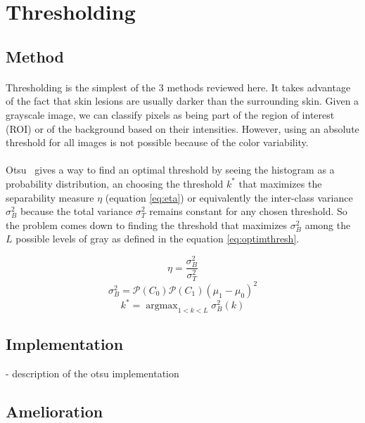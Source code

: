\documentclass[a4paper,10pt]{article}
\DeclareMathOperator*{\argmax}{argmax}
\begin{document}
\section{Thresholding}
\subsection{Method}
\paragraph{}
Thresholding is the simplest of the 3 methods reviewed here. It takes advantage of the fact that skin lesions are 
usually darker than the surrounding skin. Given a grayscale image, we can 
classify pixels as being part of the region of interest (ROI) or of the 
background based on their intensities. However, using an absolute threshold for all images is not possible because of the color variability. 
\paragraph{} Otsu~\cite{Otsu1979} 
gives a way to find an optimal threshold by seeing the histogram as a probability distribution, an choosing the threshold $k^*$ that maximizes the separability measure $\eta$ (equation \ref{eq:eta}) or equivalently the inter-class variance $\sigma_B^2$ because the total variance $\sigma_T^2$ remains constant for any chosen threshold. So the problem comes down to finding the threshold that maximizes $\sigma_B^2$ among the $L$ possible levels of gray as defined in the equation \ref{eq:optimthresh}. 

\begin{equation} \label{eq:eta}
\eta=\frac{\sigma_B^2}{\sigma_T^2} 
\end{equation}
$$
\sigma_B^2=\mathcal{P}(C_0)\mathcal{P}(C_1)(\mu_1-\mu_0)^2
$$
\begin{equation} \label{eq:optimthresh}
  k^* = \argmax_{1<k<L} \sigma_B^2(k)   
\end{equation}

\subsection{Implementation}
- description of the otsu implementation

\subsection{Amelioration}
\end{document}
